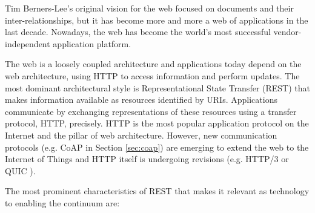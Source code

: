Tim Berners-Lee's original vision for the web focused on documents and their inter-relationships, but it has become more and more a web of applications in the last decade. Nowadays, the web has become the world's most successful vendor-independent application platform.

The web is a loosely coupled architecture and applications today depend on the web architecture, using HTTP to access information and perform updates. The most dominant architectural style is Representational State Transfer (REST) \cite{rest} that makes information available as resources identified by URIs. Applications communicate by exchanging representations of these resources using a transfer protocol, HTTP, precisely. HTTP is the most popular application protocol on the Internet and the pillar of web architecture. However, new communication protocols (e.g. CoAP in Section \ref{sec:coap}) are emerging to extend the web to the Internet of Things and HTTP itself is undergoing revisions (e.g. HTTP/3 or QUIC \cite{langley2017quic}).

The most prominent characteristics of REST that makes it relevant as technology to enabling the continuum are:

